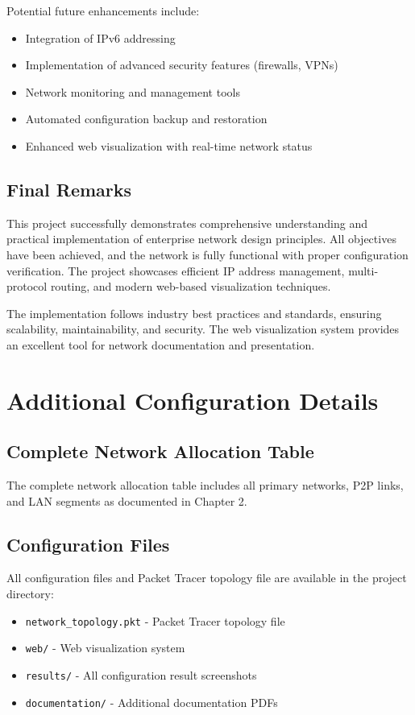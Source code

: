 \documentclass[12pt,a4paper]{report}
\begin{document}
Potential future enhancements include:
\begin{itemize}
    \item Integration of IPv6 addressing
    \item Implementation of advanced security features (firewalls, VPNs)
    \item Network monitoring and management tools
    \item Automated configuration backup and restoration
    \item Enhanced web visualization with real-time network status
\end{itemize}

\section{Final Remarks}

This project successfully demonstrates comprehensive understanding and practical implementation of enterprise network design principles. All objectives have been achieved, and the network is fully functional with proper configuration verification. The project showcases efficient IP address management, multi-protocol routing, and modern web-based visualization techniques.

The implementation follows industry best practices and standards, ensuring scalability, maintainability, and security. The web visualization system provides an excellent tool for network documentation and presentation.

\newpage

\appendix

\chapter{Additional Configuration Details}

\section{Complete Network Allocation Table}

The complete network allocation table includes all primary networks, P2P links, and LAN segments as documented in Chapter 2.

\section{Configuration Files}

All configuration files and Packet Tracer topology file are available in the project directory:
\begin{itemize}
    \item \texttt{network\_topology.pkt} - Packet Tracer topology file
    \item \texttt{web/} - Web visualization system
    \item \texttt{results/} - All configuration result screenshots
    \item \texttt{documentation/} - Additional documentation PDFs
\end{itemize}
\end{document}
